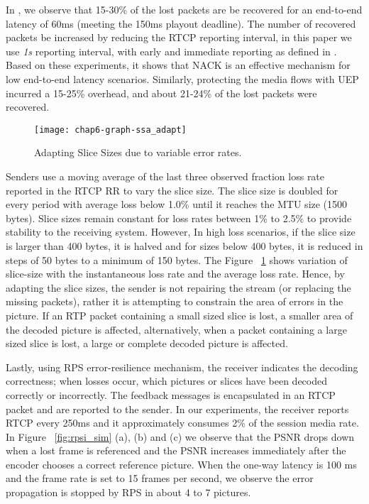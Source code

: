 In , we observe that 15-30\% of the lost packets are be
recovered for an end-to-end latency of 60ms (meeting the 150ms playout
deadline). The number of recovered packets be increased by reducing the RTCP
reporting interval, in this paper we use \emph{1s} reporting interval, with
early and immediate reporting as defined in \cite{rfc4585}. Based on these
experiments, it shows that NACK is an effective mechanism for low end-to-end
latency scenarios. Similarly, protecting the media flows with UEP incurred a
15-25\% overhead, and about 21-24\% of the lost packets were recovered.

\begin{figure}
\centerline {
\texttt{[image: chap6-graph-ssa\_adapt]}
}
\caption{Adapting Slice Sizes due to variable error rates.}
\label{fig:ssa_adapt}
\end{figure}

Senders use a moving average of the last three observed fraction loss rate
reported in the RTCP RR to vary the slice size. The slice size is doubled for
every period with average loss below 1.0\% until it reaches the MTU size
(1500 bytes). Slice sizes remain constant for loss rates between 1\% to 2.5\%
to provide stability to the receiving system. However, In high loss scenarios,
if the slice size is larger than 400 bytes, it is halved and for sizes below
400 bytes, it is reduced in steps of 50 bytes to a minimum of 150 bytes. The
Figure ~\ref{fig:ssa_adapt} shows variation of slice-size with the
instantaneous loss rate and the average loss rate. Hence, by adapting the
slice sizes, the sender is not repairing the stream (or replacing the missing
packets), rather it is attempting to constrain the area of errors in the
picture. If an RTP packet containing a small sized slice is lost, a smaller
area of the decoded picture is affected, alternatively, when a packet
containing a large sized slice is lost, a large or complete decoded picture is
affected.

Lastly, using RPS error-resilience mechanism, the receiver indicates the
decoding correctness; when losses occur, which pictures or slices have been
decoded correctly or incorrectly. The feedback messages is encapsulated in an
RTCP packet and are reported to the sender. In our experiments, the receiver
reports RTCP every 250ms and it approximately consumes 2\% of the session
media rate. In Figure ~\ref{fig:rpsi_sim} (a), (b) and (c) we observe that the
PSNR drops down when a lost frame is referenced and the PSNR increases
immediately after the encoder chooses a correct reference picture. When the
one-way latency is 100 ms and the frame rate is set to 15 frames per second,
we observe the error propagation is stopped by RPS in about 4 to 7 pictures.


